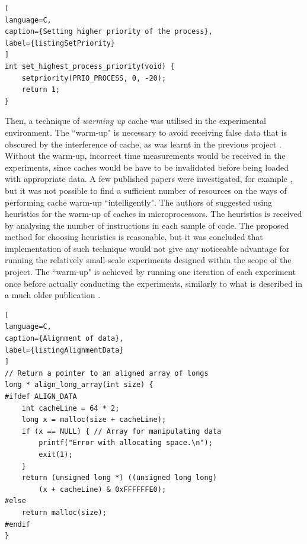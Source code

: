 \begin{lstlisting}[
language=C,
caption={Setting higher priority of the process},
label={listingSetPriority}
]
int set_highest_process_priority(void) {
	setpriority(PRIO_PROCESS, 0, -20);
	return 1;
}
\end{lstlisting}


Then, a technique of \textit{warming up} cache was utilised in the experimental environment. The ``warm-up" is necessary to avoid receiving false data that is obscured by the interference of cache, as was learnt in the previous project \cite{Bazilinskyy2013}. Without the warm-up, incorrect time measurements would be received in the experiments, since caches would be have to be invalidated before being loaded with appropriate data. A few published papers were investigated, for example \cite{Luo2004}, but it was not possible to find a sufficient number of resources on the ways of performing cache warm-up ``intelligently". The authors of \cite{Luo2004} suggested using heuristics for the warm-up of caches in microprocessors. The heuristics is received by analysing the number of instructions in each sample of code. The proposed method for choosing heuristics is reasonable, but it was concluded that implementation of such technique would not give any noticeable advantage for running the relatively small-scale experiments designed within the scope of the project. The ``warm-up" is achieved by running one iteration of each experiment once before actually conducting the experiments, similarly to what is described in a much older publication \cite{D.Muntz1991}.

\begin{lstlisting}[
language=C,
caption={Alignment of data},
label={listingAlignmentData}
]
// Return a pointer to an aligned array of longs
long * align_long_array(int size) {
#ifdef ALIGN_DATA
    int cacheLine = 64 * 2;
	long x = malloc(size + cacheLine);
	if (x == NULL) { // Array for manipulating data
		printf("Error with allocating space.\n");
		exit(1);
	}
	return (unsigned long *) ((unsigned long long)
	    (x + cacheLine) & 0xFFFFFFE0);
#else
	return malloc(size);
#endif
}
\end{lstlisting}

